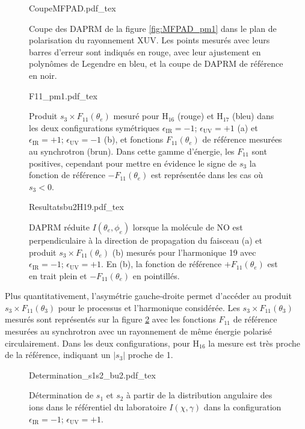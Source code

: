 \begin{figure}
\centering
\def\svgwidth{0.7\textwidth}
{CoupeMFPAD.pdf_tex}
\caption{Coupe des DAPRM de la figure \ref{fig:MFPAD_pm1} dans le plan de polarisation du rayonnement XUV. Les points mesurés avec leurs barres d'erreur sont indiqués en rouge, avec leur ajustement en polynômes de Legendre en bleu, et la coupe de DAPRM de référence en noir.}
\label{fig:CoupeMFPAD}
\end{figure}

\begin{figure}
\centering
\def\svgwidth{\textwidth}
{F11_pm1.pdf_tex}
\caption{Produit $s_3 \times F_{11}(\theta_e)$ mesuré pour H$_{16}$ (rouge) et H$_{17}$ (bleu) dans les deux configurations symétriques $\epsilon_{\text{IR}} = -1$; $\epsilon_{\text{UV}} = +1$ (a) et  $\epsilon_{\text{IR}} = +1$; $\epsilon_{\text{UV}} = -1$ (b), et fonctions $F_{11}(\theta_e)$ de référence mesurées au synchrotron (brun). Dans cette gamme d'énergie, les $F_{11}$ sont positives, cependant pour mettre en évidence le signe de $s_3$ la fonction de référence $-F_{11}(\theta_e)$ est représentée dans les cas où $s_3 <0$.}
\label{fig:F11_pm1}
\end{figure}

\begin{figure}
\centering
\def\svgwidth{\textwidth}
{Resultatsbu2H19.pdf_tex}
\caption{DAPRM réduite $I(\theta_e,\phi_e)$ lorsque la molécule de NO est perpendiculaire à la direction de propagation du faisceau (a) et produit $s_3 \times F_{11}(\theta_e)$ (b) mesurés pour l'harmonique 19 avec $\epsilon_{\text{IR}} = -1$; $\epsilon_{\text{UV}} = +1$. En (b), la fonction de référence $+F_{11}(\theta_e)$ est en trait plein et $-F_{11}(\theta_e)$ en pointillés.}
\label{fig:Resultatsbu2H19}
\end{figure}

Plus quantitativement, l'asymétrie gauche-droite permet d'accéder au produit $s_3 \times F_{11}(\theta_3)$ pour le processus et l'harmonique considérée. Les $s_3 \times F_{11}(\theta_3)$ mesurés sont représentés sur la figure \ref{fig:F11_pm1} avec les fonctions $F_{11}$ de référence mesurées au synchrotron avec un rayonnement de même énergie polarisé circulairement. Dans les deux configurations, pour H$_{16}$ la mesure est très proche de la référence, indiquant un $|s_3|$ proche de 1. 

\begin{figure}
\centering
\def\svgwidth{\textwidth}
{Determination_s1s2_bu2.pdf_tex}
\caption{Détermination de $s_1$ et $s_2$ à partir de la distribution angulaire des ions dans le référentiel du laboratoire $I(\chi,\gamma)$ dans la configuration $\epsilon_{\text{IR}} = -1$; $\epsilon_{\text{UV}} = +1$.}
\label{fig:s1s2_bu2}
\end{figure}

